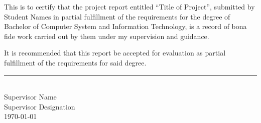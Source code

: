 
This is to certify that the project report entitled ``{Title of Project}'', submitted by {Student Names} in partial fulfillment of the requirements for the degree of Bachelor of Computer System and Information Technology, is a record of bona fide work carried out by them under my supervision and guidance.

It is recommended that this report be accepted for evaluation as partial fulfillment of the requirements for said degree.

\vspace{2cm}
\noindent
\rule{4.5cm}{0.4pt}\\[2mm]
{Supervisor Name}\\
{Supervisor Designation}\\
\today
